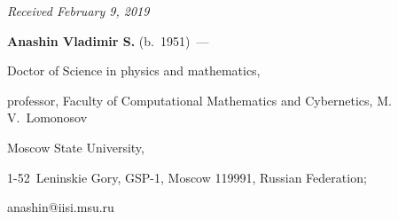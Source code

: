 \vspace*{-6pt}





\hfill{\small\textit{Received February 9, 2019}}



























\Contrl





\noindent


\textbf{Anashin Vladimir S.} (b.\ 1951)~--- 


Doctor of Science in physics and mathematics,


professor, Faculty of Computational Mathematics and Cybernetics, M.\,V.~Lomonosov


Moscow State University,


1-52~Leninskie Gory, GSP-1,  Moscow 119991, Russian Federation;


 \mbox{anashin@iisi.msu.ru}


\label{end\stat}





\renewcommand{\bibname}{\protect\rm Литература}  


